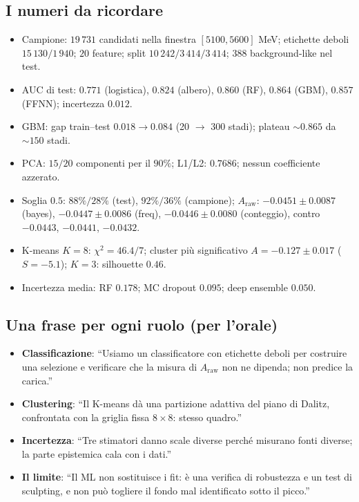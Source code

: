 \documentclass[11pt,a4paper]{article}
\newcommand{\Araw}{A_{\mathrm{raw}}}
\begin{document}
\subsection*{I numeri da ricordare}
\begin{itemize}
\item Campione: $19\,731$ candidati nella finestra $[5100,5600]$ MeV; etichette deboli $15\,130/1\,940$; $20$ feature; split $10\,242/3\,414/3\,414$; $388$ background-like nel test.
\item AUC di test: $0.771$ (logistica), $0.824$ (albero), $0.860$ (RF), $0.864$ (GBM), $0.857$ (FFNN); incertezza $0.012$.
\item GBM: gap train--test $0.018\to0.084$ (20 $\to$ 300 stadi); plateau $\sim0.865$ da $\sim150$ stadi.
\item PCA: $15/20$ componenti per il $90\%$; L1/L2: $0.7686$; nessun coefficiente azzerato.
\item Soglia $0.5$: $88\%/28\%$ (test), $92\%/36\%$ (campione); $\Araw$: $-0.0451\pm0.0087$ (bayes), $-0.0447\pm0.0086$ (freq), $-0.0446\pm0.0080$ (conteggio), contro $-0.0443$, $-0.0441$, $-0.0432$.
\item K-means $K=8$: $\chi^2=46.4/7$; cluster pi\`u significativo $A=-0.127\pm0.017$ ($S=-5.1$); $K=3$: silhouette $0.46$.
\item Incertezza media: RF $0.178$; MC dropout $0.095$; deep ensemble $0.050$.
\end{itemize}

\subsection*{Una frase per ogni ruolo (per l'orale)}
\begin{itemize}
\item \textbf{Classificazione}: ``Usiamo un classificatore con etichette deboli per costruire una selezione e verificare che la misura di $\Araw$ non ne dipenda; non predice la carica.''
\item \textbf{Clustering}: ``Il K-means d\`a una partizione adattiva del piano di Dalitz, confrontata con la griglia fissa $8\times8$: stesso quadro.''
\item \textbf{Incertezza}: ``Tre stimatori danno scale diverse perch\'e misurano fonti diverse; la parte epistemica cala con i dati.''
\item \textbf{Il limite}: ``Il ML non sostituisce i fit: \`e una verifica di robustezza e un test di sculpting, e non pu\`o togliere il fondo mal identificato sotto il picco.''
\end{itemize}
\end{document}
